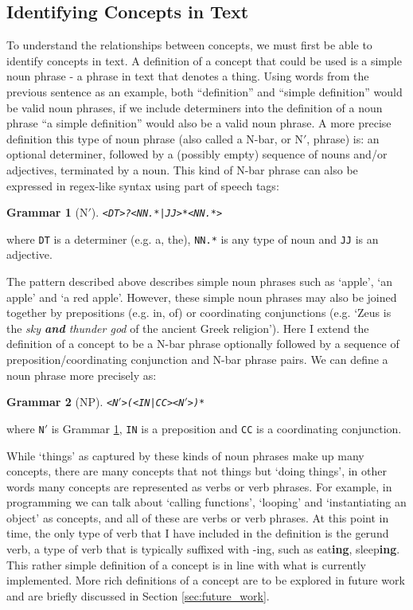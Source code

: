 \documentclass[12pt]{article}
\theoremstyle{grammarstyle}
\newtheorem{gram}{Grammar}
\begin{document}
\subsection{Identifying Concepts in Text} \label{sec:idenifying_concepts}
To understand the relationships between concepts, we must first be able to identify concepts in text. A definition of a concept that could be used is a simple noun phrase - a phrase in text that denotes a thing. Using words from the previous sentence as an example, both ``definition'' and ``simple definition'' would be valid noun phrases, if we include determiners  into the definition of a noun phrase ``a simple definition'' would also be a valid noun phrase. A more precise definition this type of noun phrase (also called a N-bar, or N$'$, phrase) is: an optional determiner, followed by a (possibly empty) sequence of nouns and/or adjectives, terminated by a noun. This kind of N-bar phrase can also be expressed in regex-like syntax using part of speech tags: 
\begin{gram}[N$'$] \label{eq:nbar_pattern}
    \texttt{<DT>?<NN.*|JJ>*<NN.*>}    
\end{gram}
\noindent
where \texttt{DT} is a determiner (e.g. a, the), \texttt{NN.*} is any type of noun and \texttt{JJ} is an adjective.

The pattern described above describes simple noun phrases such as `apple', `an apple' and `a red apple'. However, these simple noun phrases may also be joined together by prepositions (e.g. in, of) or coordinating conjunctions (e.g. `Zeus is the \textit{sky \textbf{and} thunder god} of the ancient Greek religion'). Here I extend the definition of a concept to be a N-bar phrase optionally followed by a sequence of preposition/coordinating conjunction and N-bar phrase pairs. We can define a noun phrase more precisely as: 
\begin{gram}[NP] \label{eq:np_pattern}
    \texttt{<N$'$>(<IN|CC><N$'$>)*}
\end{gram}
\noindent
where \texttt{N$'$} is Grammar \ref{eq:nbar_pattern}, \texttt{IN} is a preposition and \texttt{CC} is a coordinating conjunction. 

While `things' as captured by these kinds of noun phrases make up many concepts, there are many concepts that not  things but `doing things', in other words many concepts are represented as verbs or verb phrases. For example, in programming we can talk about `calling functions', `looping' and `instantiating an object' as concepts, and all of these are verbs or verb phrases. At this point in time, the only type of verb that I have included in the definition is the gerund verb, a type of verb that is typically suffixed with -ing, such as eat\textbf{ing}, sleep\textbf{ing}.
This rather simple definition of a concept is in line with what is currently implemented. More rich definitions of a concept are to be explored in future work and are briefly discussed in Section \ref{sec:future_work}.
\end{document}
